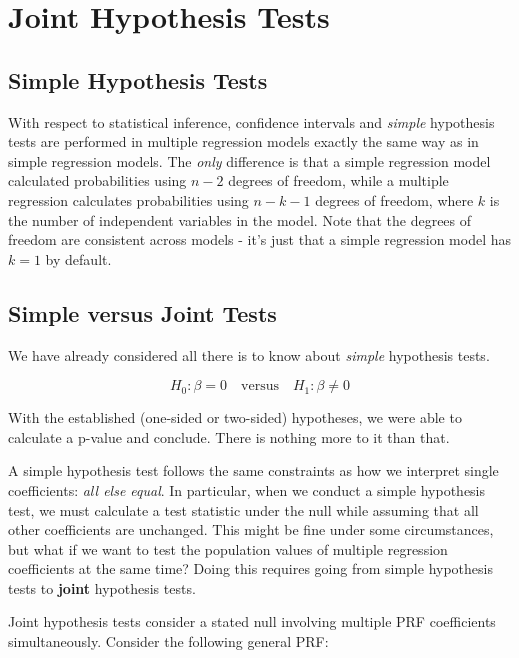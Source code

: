\documentclass[
]{book}
\begin{document}
\hypertarget{joint-hypothesis-tests}{%
\section{Joint Hypothesis Tests}\label{joint-hypothesis-tests}}

\hypertarget{simple-hypothesis-tests}{%
\subsection{Simple Hypothesis Tests}\label{simple-hypothesis-tests}}

With respect to statistical inference, confidence intervals and \emph{simple} hypothesis tests are performed in multiple regression models exactly the same way as in simple regression models. The \emph{only} difference is that a simple regression model calculated probabilities using \(n-2\) degrees of freedom, while a multiple regression calculates probabilities using \(n-k-1\) degrees of freedom, where \(k\) is the number of independent variables in the model. Note that the degrees of freedom are consistent across models - it's just that a simple regression model has \(k=1\) by default.

\hypertarget{simple-versus-joint-tests}{%
\subsection{Simple versus Joint Tests}\label{simple-versus-joint-tests}}

We have already considered all there is to know about \emph{simple} hypothesis tests.

\[H_0: \beta = 0 \quad \text{versus} \quad H_1: \beta \neq 0\]

With the established (one-sided or two-sided) hypotheses, we were able to calculate a p-value and conclude. There is nothing more to it than that.

A simple hypothesis test follows the same constraints as how we interpret single coefficients: \emph{all else equal}. In particular, when we conduct a simple hypothesis test, we must calculate a test statistic under the null while assuming that all other coefficients are unchanged. This might be fine under some circumstances, but what if we want to test the population values of multiple regression coefficients at the same time? Doing this requires going from simple hypothesis tests to \textbf{joint} hypothesis tests.

Joint hypothesis tests consider a stated null involving multiple PRF coefficients simultaneously. Consider the following general PRF:
\end{document}
